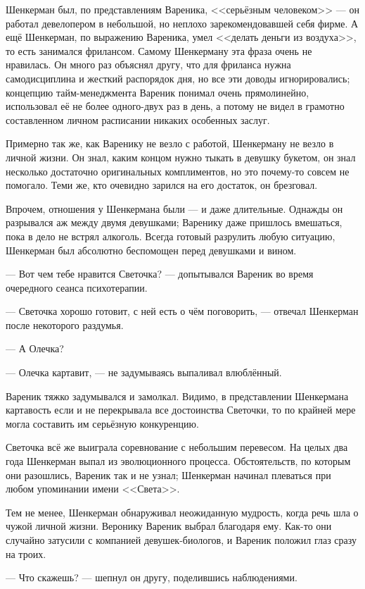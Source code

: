 \documentclass[a4paper,10pt,fleqn]{book}\usepackage{polyglossia}\setdefaultlanguage{english}\setotherlanguage{russian}\defaultfontfeatures{Ligatures=TeX,Mapping=tex-text} \usepackage{xcolor}\definecolor{lightgray}{HTML}{bbbbbb}\color{lightgray}\newcommand{\ml}[3]{\textcolor{black}{#3}}
\begin{document}
Шенкерман был, по представлениям Вареника, <<серьёзным человеком>> --- он работал девелопером в небольшой, но неплохо зарекомендовавшей себя фирме.
А ещё Шенкерман, по выражению Вареника, умел <<делать деньги из воздуха>>, то есть занимался фрилансом.
Самому Шенкерману эта фраза очень не нравилась.
Он много раз объяснял другу, что для фриланса нужна самодисциплина и жесткий распорядок дня, но все эти доводы игнорировались;
концепцию тайм-менеджмента Вареник понимал очень прямолинейно, использовал её не более одного-двух раз в день, а потому не видел в грамотно составленном личном расписании никаких особенных заслуг.

Примерно так же, как Варенику не везло с работой, Шенкерману не везло в личной жизни.
Он знал, каким концом нужно тыкать в девушку букетом, он знал несколько достаточно оригинальных комплиментов, но это почему-то совсем не помогало.
Теми же, кто очевидно зарился на его достаток, он брезговал.

Впрочем, отношения у Шенкермана были --- и даже длительные.
Однажды он разрывался аж между двумя девушками;
Варенику даже пришлось вмешаться, пока в дело не встрял алкоголь.
Всегда готовый разрулить любую ситуацию, Шенкерман был абсолютно беспомощен перед девушками и вином.

--- Вот чем тебе нравится Светочка? --- допытывался Вареник во время очередного сеанса психотерапии.

--- Светочка хорошо готовит, с ней есть о чём поговорить, --- отвечал Шенкерман после некоторого раздумья.

--- А Олечка?

--- Олечка картавит, --- не задумываясь выпаливал влюблённый.

Вареник тяжко задумывался и замолкал.
Видимо, в представлении Шенкермана картавость если и не перекрывала все достоинства Светочки, то по крайней мере могла составить им серьёзную конкуренцию.

Светочка всё же выиграла соревнование с небольшим перевесом.
На целых два года Шенкерман выпал из эволюционного процесса.
Обстоятельств, по которым они разошлись, Вареник так и не узнал;
Шенкерман начинал плеваться при любом упоминании имени <<Света>>.

Тем не менее, Шенкерман обнаруживал неожиданную мудрость, когда речь шла о чужой личной жизни.
Веронику Вареник выбрал благодаря ему.
Как-то они случайно затусили с компанией девушек-биологов, и Вареник положил глаз сразу на троих.

--- Что скажешь? --- шепнул он другу, поделившись наблюдениями.
\end{document}
